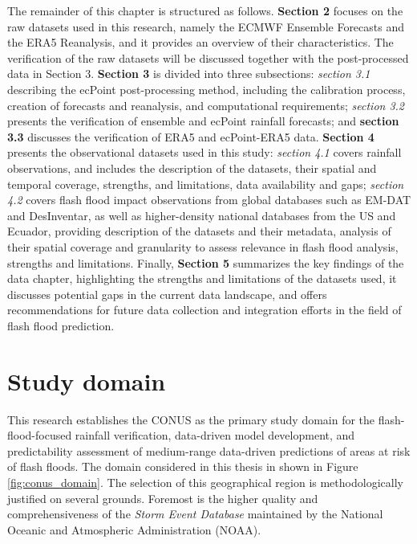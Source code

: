 The  remainder of this chapter is structured as follows. \textbf{Section 2} focuses on the raw datasets used in this research, namely the ECMWF Ensemble Forecasts and the ERA5 Reanalysis, and it provides an overview of their characteristics. The verification of the raw datasets will be discussed together with the post-processed data in Section 3. \textbf{Section 3} is divided into three subsections: \textit{section 3.1} describing the ecPoint post-processing method, including the calibration process, creation of forecasts and reanalysis, and computational requirements; \textit{section 3.2} presents the verification of ensemble and ecPoint rainfall forecasts; and \textbf{section 3.3} discusses the verification of ERA5 and ecPoint-ERA5 data. \textbf{Section 4} presents the observational datasets used in this study: \textit{section 4.1} covers rainfall observations, and includes the description of the datasets, their spatial and temporal coverage, strengths, and limitations, data availability and gaps; \textit{section 4.2} covers flash flood impact observations from global databases such as EM-DAT and DesInventar, as well as higher-density national databases from the US and Ecuador, providing description of the datasets and their metadata, analysis of their spatial coverage and granularity to assess relevance in flash flood analysis, strengths and limitations. Finally, \textbf{Section 5} summarizes the key findings of the data chapter, highlighting the strengths and limitations of the datasets used, it discusses potential gaps in the current data landscape, and offers recommendations for future data collection and integration efforts in the field of flash flood prediction. 



\section{Study domain}

This research establishes the CONUS as the primary study domain for the flash-flood-focused rainfall verification, data-driven model development, and predictability assessment of medium-range data-driven predictions of areas at risk of flash floods. The domain considered in this thesis in shown in Figure \ref{fig:conus_domain}. The selection of this geographical region is methodologically justified on several grounds. Foremost is the higher quality and comprehensiveness of the \textit{Storm Event Database} maintained by the National Oceanic and Atmospheric Administration (NOAA). 

